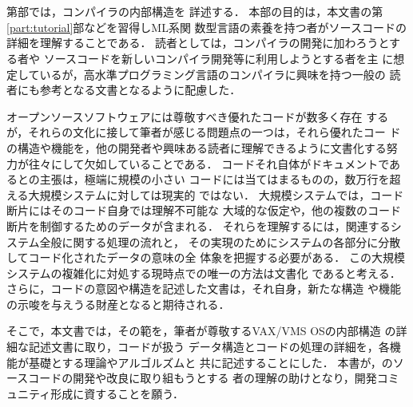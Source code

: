 \ifjp%
\else%
\fi%

\part{}
\label{part:internals}

\section*{}
\ifjp%
	第\ref{part:internals}部では，\smlsharp{}コンパイラの内部構造を
詳述する．
	本部の目的は，本文書の第\ref{part:tutorial}部などを習得しML系関
数型言語の素養を持つ者が\smlsharp{}ソースコードの詳細を理解することである．
	読者としては，\smlsharp{}コンパイラの開発に加わろうとする者や
\smlsharp{}ソースコードを新しいコンパイラ開発等に利用しようとする者を主
に想定しているが，高水準プログラミング言語のコンパイラに興味を持つ一般の
読者にも参考となる文書となるように配慮した．

	オープンソースソフトウェアには尊敬すべき優れたコードが数多く存在
するが，それらの文化に接して筆者が感じる問題点の一つは，それら優れたコー
ドの構造や機能を，他の開発者や興味ある読者に理解できるように文書化する努
力が往々にして欠如していることである．
	コードそれ自体がドキュメントであるとの主張は，極端に規模の小さい
コードには当てはまるものの，数万行を超える大規模システムに対しては現実的
ではない．
	大規模システムでは，コード断片にはそのコード自身では理解不可能な
大域的な仮定や，他の複数のコード断片を制御するためのデータが含まれる．
	それらを理解するには，関連するシステム全般に関する処理の流れと，
その実現のためにシステムの各部分に分散してコード化されたデータの意味の全
体象を把握する必要がある．
	この大規模システムの複雑化に対処する現時点での唯一の方法は文書化
であると考える．
	さらに，コードの意図や構造を記述した文書は，それ自身，新たな構造
や機能の示唆を与えうる財産となると期待される．

	そこで，本文書では，その範を，筆者が尊敬するVAX/VMS OSの内部構造
の詳細な記述文書\cite{Kenah:1984:VID:225}に取り，\smlsharp{}コードが扱う
データ構造とコードの処理の詳細を，各機能が基礎とする理論やアルゴルズムと
共に記述することにした．
	本書が，\smlsharp{}のソースコードの開発や改良に取り組もうとする
者の理解の助けとなり，\smlsharp{}開発コミュニティ形成に資することを願う．

